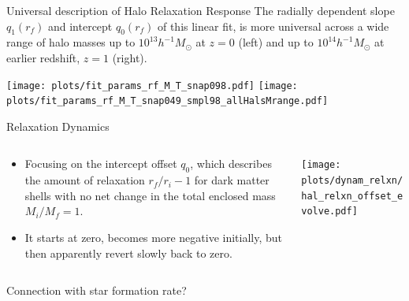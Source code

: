 \documentclass{beamer}
\newcommand{\Mh}{\ensuremath{h^{-1}M_{\odot}}}
\begin{document}
\begin{frame}{Universal description of Halo Relaxation Response}
    The radially dependent slope $q_1(r_f)$ and intercept $q_0(r_f)$ of this linear fit, is more universal across a wide range of halo masses up to $10^{13} \Mh$ at $z=0$ (left) and up to $10^{14} \Mh$ at earlier redshift, $z=1$ (right).
    \begin{center}
        \texttt{[image: plots/fit\_params\_rf\_M\_T\_snap098.pdf]}
        \texttt{[image: plots/fit\_params\_rf\_M\_T\_snap049\_smpl98\_allHalsMrange.pdf]}
        \hspace{-3.8cm}\hspace{20cm}
    \end{center}
\end{frame}



\begin{frame}{Relaxation Dynamics}
        
    \begin{columns}
        \begin{column}{0.5\linewidth} 
            \begin{itemize}
                \item Focusing on the intercept offset $q_0$, which describes the amount of relaxation $r_f/r_i-1$ for dark matter shells with no net change in the total enclosed mass $M_i/M_f=1$.
                \item It starts at zero, becomes more negative initially, but then apparently revert slowly back to zero.
            \end{itemize}
        \end{column}
        \begin{column}{0.49\linewidth}
            \begin{center}
                \texttt{[image: plots/dynam\_relxn/hal\_relxn\_offset\_evolve.pdf]}
            \end{center}
        \end{column}
    \end{columns}
    \begin{block}{}
        Connection with star formation rate?
        ~\vspace{1cm}
    \end{block}
\end{frame}
\end{document}
